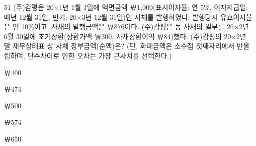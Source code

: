 \begin{question}{51}
(주)감평은 20×1년 1월 1일에 액면금액 ￦1,000(표시이자율: 연 5\%, 이자지급일: 매년 12월 31일, 만기: 20×3년 12월 31일)인 사채를 발행하였다. 발행당시 유효이자율은 연 10\%이고, 사채의 발행금액은 ￦876이다. (주)감평은 동 사채의 일부를 20×2년 6월 30일에 조기상환(상환가액 ￦300, 사채상환이익 ￦84)했다. (주)감평의 20×2년 말 재무상태표 상 사채 장부금액(순액)은? (단, 화폐금액은 소수점 첫째자리에서 반올림하며, 단수차이로 인한 오차는 가장 근사치를 선택한다.)
\begin{choices}
  \item ￦400
  \item ￦474
  \item ￦500
  \item ￦574
  \item ￦650
\end{choices}
\end{question}
